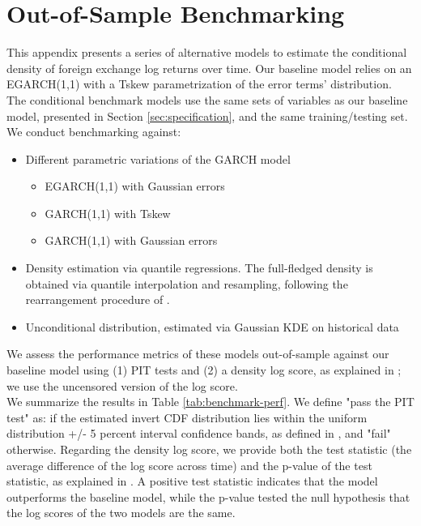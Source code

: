\documentclass[11pt]{article}
\begin{document}
\section{Out-of-Sample Benchmarking}
\label{sec:benchmarking}

This  appendix  presents  a  series  of alternative  models  to  estimate  the
conditional density of  foreign exchange log returns over  time.  Our baseline
model  relies on  an EGARCH(1,1)  with a  Tskew parametrization  of the  error
terms’ distribution.   The conditional benchmark  models use the same  sets of
variables as our baseline model, presented in Section \ref{sec:specification},
and the same training/testing set.\\

We conduct benchmarking against:

\begin{itemize}
\item Different parametric variations of the GARCH model
  \begin{itemize}
  \item EGARCH(1,1) with Gaussian errors
  \item GARCH(1,1) with Tskew
  \item GARCH(1,1) with Gaussian errors
  \end{itemize}
\item Density estimation via quantile regressions. The full-fledged density is
  obtained via quantile interpolation and resampling, following the
  rearrangement procedure of \cite{chernozhukov2010}.
\item Unconditional distribution, estimated via Gaussian KDE on historical data
\end{itemize}

We assess  the performance metrics  of these models out-of-sample  against our
baseline model using (1)  PIT tests and (2) a density  log score, as explained
in \cite{diks2011}; we use the uncensored version of the log score.\\

We summarize  the results in  Table \ref{tab:benchmark-perf}. We  define "pass
the PIT  test" as: if  the estimated invert  CDF distribution lies  within the
uniform distribution  +/- 5 percent  interval confidence bands, as  defined in
\cite{rossi2019}, and "fail"  otherwise.  Regarding the density  log score, we
provide  both the  test statistic  (the average  difference of  the log  score
across  time)  and  the  p-value  of  the  test  statistic,  as  explained  in
\cite{diks2011}.   A   positive  test  statistic  indicates   that  the  model
outperforms the baseline  model, while the p-value tested  the null hypothesis
that the log scores of the two models are the same.\\
\end{document}
